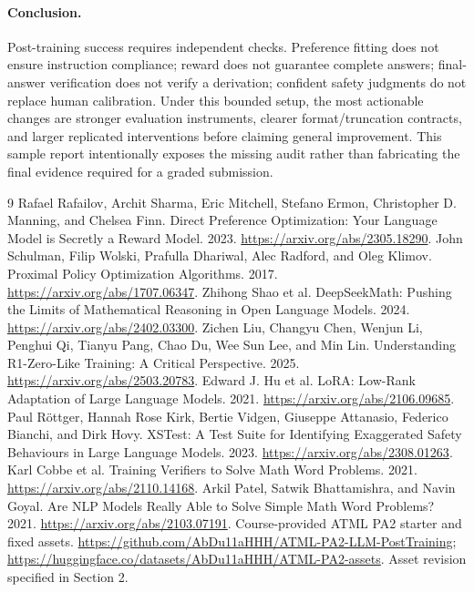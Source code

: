 \documentclass{article}
\begin{document}
\paragraph{Conclusion.} Post-training success requires independent checks. Preference fitting does not ensure instruction compliance; reward does not guarantee complete answers; final-answer verification does not verify a derivation; confident safety judgments do not replace human calibration. Under this bounded setup, the most actionable changes are stronger evaluation instruments, clearer format/truncation contracts, and larger replicated interventions before claiming general improvement. This sample report intentionally exposes the missing audit rather than fabricating the final evidence required for a graded submission.
\clearpage
\begin{thebibliography}{9}
 Rafael Rafailov, Archit Sharma, Eric Mitchell, Stefano Ermon, Christopher D. Manning, and Chelsea Finn. Direct Preference Optimization: Your Language Model is Secretly a Reward Model. 2023. \url{https://arxiv.org/abs/2305.18290}.
 John Schulman, Filip Wolski, Prafulla Dhariwal, Alec Radford, and Oleg Klimov. Proximal Policy Optimization Algorithms. 2017. \url{https://arxiv.org/abs/1707.06347}.
 Zhihong Shao et al. DeepSeekMath: Pushing the Limits of Mathematical Reasoning in Open Language Models. 2024. \url{https://arxiv.org/abs/2402.03300}.
 Zichen Liu, Changyu Chen, Wenjun Li, Penghui Qi, Tianyu Pang, Chao Du, Wee Sun Lee, and Min Lin. Understanding R1-Zero-Like Training: A Critical Perspective. 2025. \url{https://arxiv.org/abs/2503.20783}.
 Edward J. Hu et al. LoRA: Low-Rank Adaptation of Large Language Models. 2021. \url{https://arxiv.org/abs/2106.09685}.
 Paul R\"ottger, Hannah Rose Kirk, Bertie Vidgen, Giuseppe Attanasio, Federico Bianchi, and Dirk Hovy. XSTest: A Test Suite for Identifying Exaggerated Safety Behaviours in Large Language Models. 2023. \url{https://arxiv.org/abs/2308.01263}.
 Karl Cobbe et al. Training Verifiers to Solve Math Word Problems. 2021. \url{https://arxiv.org/abs/2110.14168}.
 Arkil Patel, Satwik Bhattamishra, and Navin Goyal. Are NLP Models Really Able to Solve Simple Math Word Problems? 2021. \url{https://arxiv.org/abs/2103.07191}.
 Course-provided ATML PA2 starter and fixed assets. \url{https://github.com/AbDu11aHHH/ATML-PA2-LLM-PostTraining}; \url{https://huggingface.co/datasets/AbDu11aHHH/ATML-PA2-assets}. Asset revision specified in Section 2.
\end{thebibliography}
\end{document}
